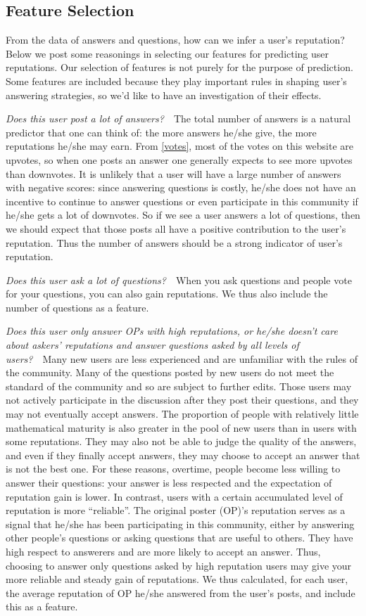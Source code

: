 \documentclass[12pt]{article}
\begin{document}
\subsection{Feature Selection}
From the data of answers and questions, how can we infer a user's reputation? Below we post some reasonings in selecting our features for predicting user reputations. Our selection of features is not purely for the purpose of prediction. Some features are included because they play important rules in shaping user's answering strategies, so we'd like to have an investigation of their effects. 

\emph{Does this user post a lot of answers?}~~The total number of answers is a natural predictor that one can think of: the more answers he/she give, the more reputations he/she may earn. From \cref{votes}, most of the votes on this website are upvotes, so when one posts an answer one generally expects to see more upvotes than downvotes. It is unlikely that a user will have a large number of answers with negative scores: since answering questions is costly, he/she does not have an incentive to continue to answer questions or even participate in this community if he/she gets a lot of downvotes. So if we see a user answers a lot of questions, then we should expect that those posts all have a positive contribution to the user's reputation. Thus the number of answers should be a strong indicator of user's reputation.

\emph{Does this user ask a lot of questions?}~~When you ask questions and people vote for your questions, you can also gain reputations. We thus also include the number of questions as a feature.

\emph{Does this user only answer OPs with high reputations, or he/she doesn't care about askers' reputations and answer questions asked by all levels of users?}~~Many new users are less experienced and are unfamiliar with the rules of the community. Many of the questions posted by new users do not meet the standard of the community and so are subject to further edits. Those users may not actively participate in the discussion after they post their questions, and they may not eventually accept answers. The proportion of people with relatively little mathematical maturity is also greater in the pool of new users than in users with some reputations. They may also not be able to judge the quality of the answers, and even if they finally accept answers, they may choose to accept an answer that is not the best one. For these reasons, overtime, people become less willing to answer their questions: your answer is less respected and the expectation of reputation gain is lower. In contrast, users with a certain accumulated level of reputation is more ``reliable''. The original poster (OP)'s reputation serves as a signal that he/she has been participating in this community, either by answering other people's questions or asking questions that are useful to others. They have high respect to answerers and are more likely to accept an answer. Thus, choosing to answer only questions asked by high reputation users may give your more reliable and steady gain of reputations. We thus calculated, for each user, the average reputation of OP he/she answered from the user's posts, and include this as a feature. 
\end{document}
